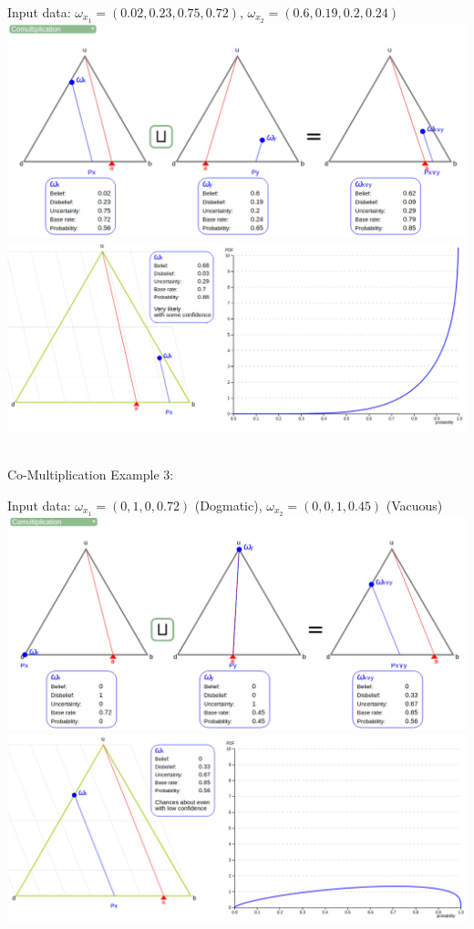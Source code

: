 \documentclass[UTF8]{article}
\newcommand{\opinion}[5]{$\omega_{#1} = (#2, #3, #4, #5)$}
\begin{document}
    \begin{center}
        Input data: 
        \opinion{x_1}{0.02}{0.23}{0.75}{0.72}, 
        \opinion{x_2}{0.6}{0.19}{0.2}{0.24}\\
        \includegraphics[width=6in]{images/comul2.png}
        \includegraphics[width=6in]{images/comul2viz.png}
    \end{center}
    \hrulefill\\
Co-Multiplication Example 3:
    \begin{center}
        Input data: 
        \opinion{x_1}{0}{1}{0}{0.72} (Dogmatic), 
        \opinion{x_2}{0}{0}{1}{0.45} (Vacuous)\\
        \includegraphics[width=6in]{images/comul3.png}
        \includegraphics[width=6in]{images/comul3viz.png}
\end{center}
\end{document}
